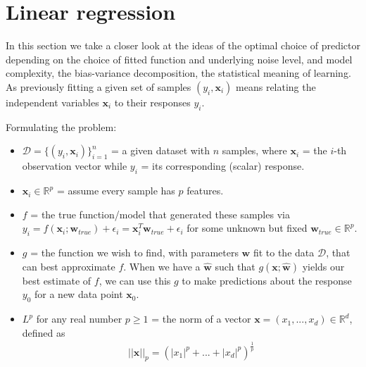 \documentclass[norsk,a4paper,11pt]{article}
\begin{document}
\section{Linear regression}
In this section we take a closer look at the ideas of the optimal choice of predictor depending on the choice of fitted function and underlying noise level, and model complexity, the bias-variance decomposition, the statistical meaning of learning. As previously fitting a given set of samples $(y_i, \mathbf{x}_i)$ means relating the independent variables $\mathbf{x}_i$ to their responses $y_i$.

Formulating the problem:
\begin{itemize}
	\item $\mathcal{D} = \{ (y_i, \mathbf{x}_i) \}_{i=1}^n$ = a given dataset with $n$ samples, where $\mathbf{x}_i$ = the $i$-th observation vector while $y_i$ = its corresponding (scalar) response.
	\item $\mathbf{x}_i \in \mathbb{R}^p $ = assume every sample has $p$ features.
	\item $f$ = the true function/model that generated these samples via $y_i = f(\mathbf{x}_i ; \mathbf{w}_{true}) + \epsilon_i = \mathbf{x}_i^T \mathbf{w}_{true} + \epsilon_i$ for some unknown but fixed $\mathbf{w}_{true} \in \mathbb{R}^p$.
	\item $g$ = the function we wish to find, with parameters $\mathbf{w}$ fit to the data $\mathcal{D}$, that can best approximate $f$. When we have a $\hat{\mathbf{w}}$ such that $g(\mathbf{x}; \hat{\mathbf{w}})$ yields our best estimate of $f$, we can use this $g$ to make predictions about the response $y_0$ for a new data point $\mathbf{x}_0$.
	\item $L^p$ for any real number $p \geq 1$ = the norm of a vector $\mathbf{x} = (x_1, ..., x_d) \in \mathbb{R}^d$, defined as
	\begin{align}
		||\mathbf{x}||_p = (|x_1|^p + ... + |x_d|^p)^\frac{1}{p}
	\end{align}
\end{itemize}
\end{document}
